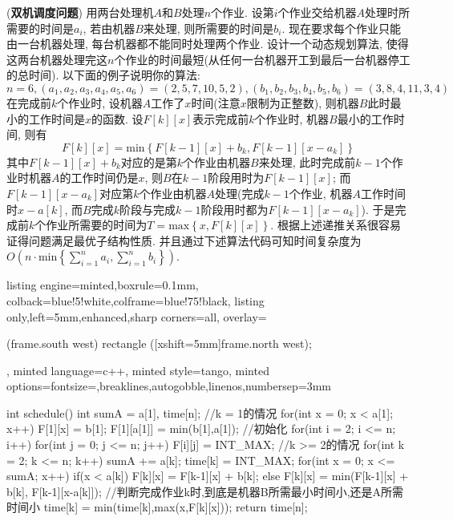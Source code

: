 \documentclass{article}
\begin{document}
\begin{homeworkProblem}
	(\textbf{双机调度问题}) 用两台处理机$A$和$B $处理$n $个作业. 设第$i $个作业交给机器$A $处理时所需要的时间是$a_i$, 若由机器$B $来处理, 则所需要的时间是$b_i$. 现在要求每个作业只能由一台机器处理, 每台机器都不能同时处理两个作业. 设计一个动态规划算法, 使得这两台机器处理完这$n$个作业的时间最短(从任何一台机器开工到最后一台机器停工的总时间). 以下面的例子说明你的算法:
	$$
	n=6,\left( a_1,a_2,a_3,a_4,a_5,a_6 \right) =\left( 2,5,7,10,5,2 \right) , \left( b_1,b_2,b_3,b_4,b_5,b_6 \right) =\left( 3,8,4,11,3,4 \right) 
	$$
	\solution 在完成前$k$个作业时, 设机器$A$工作了$x$时间(注意$x$限制为正整数), 则机器$B$此时最小的工作时间是$x$的函数. 设$F[k][x]$表示完成前$k$个作业时, 机器$B$最小的工作时间, 则有
	$$
	F\left[ k \right] [x] =\text{min} \left\{ F\left[ k-1 \right] [x] +b_k,F\left[ k-1 \right] [x-a_k] \right\} 
	$$
	其中$F[k-1][x]+b_k$对应的是第$k$个作业由机器$B$来处理, 此时完成前$k-1$个作业时机器$A$的工作时间仍是$x$, 则$B$在$k-1$阶段用时为$F[k-1][x]$; 而$F[k-1][x-a_k]$对应第$k$个作业由机器$A$处理(完成$k-1$个作业, 机器$A$工作时间时$x-a[k]$, 而$B$完成$k$阶段与完成$k-1$阶段用时都为$F[k-1][x-a_k]$). 于是完成前$k$个作业所需要的时间为$T=\text{max} \left\{ x,F\left[ k \right] [x] \right\} $. 根据上述递推关系很容易证得问题满足最优子结构性质. 并且通过下述算法代码可知时间复杂度为$\displaystyle O\left( n\cdot \text{min} \left\{ \sum_{i=1}^n{a_i},\sum_{i=1}^n{b_i} \right\} \right)$.
\begin{tcblisting}{listing engine=minted,boxrule=0.1mm,
colback=blue!5!white,colframe=blue!75!black,
listing only,left=5mm,enhanced,sharp corners=all,
overlay={\begin{tcbclipinterior} (frame.south west)
rectangle ([xshift=5mm]frame.north west);\end{tcbclipinterior}},
minted language=c++,
minted style=tango,
minted options={fontsize=\small,breaklines,autogobble,linenos,numbersep=3mm}}
int schedule() {
    int sumA = a[1], time[n];
    //k = 1的情况
    for(int x = 0; x < a[1]; x++) {
        F[1][x] = b[1];
    }
    F[1][a[1]] = min(b[1],a[1]);
    //初始化
    for(int i = 2; i <= n; i++) {
        for(int j = 0; j <= n; j++) {
            F[i][j] = INT_MAX;
        }
    }
    //k >= 2的情况
    for(int k = 2; k <= n; k++) {
        sumA += a[k];
        time[k] = INT_MAX;
        for(int x = 0; x <= sumA; x++) {
            if(x < a[k]) {
                F[k][x] = F[k-1][x] + b[k];
            } else {
                F[k][x] = min(F[k-1][x] + b[k], F[k-1][x-a[k]]);
            }
            //判断完成作业k时,到底是机器B所需最小时间小,还是A所需时间小
            time[k] = min(time[k],max(x,F[k][x]));
        }
    }
    return time[n];
}
\end{tcblisting}
\end{homeworkProblem}
\end{document}
